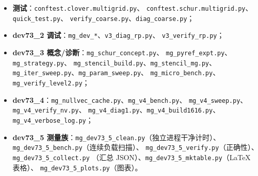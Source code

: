 \documentclass[11pt,a4paper]{article}
\begin{document}
\begin{itemize}
  \item \textbf{测试}：\texttt{conftest.clover.multigrid.py}、
        \texttt{conftest.schur.multigrid.py}、\texttt{quick\_test.py}、
        \texttt{verify\_coarse.py}、\texttt{diag\_coarse.py}；
  \item \textbf{dev73\_2 调试}：\texttt{mg\_dev\_*}、\texttt{v3\_diag\_rp.py}、
        \texttt{v3\_verify\_rp.py}；
  \item \textbf{dev73\_3 概念/诊断}：\texttt{mg\_schur\_concept.py}、
        \texttt{mg\_pyref\_expt.py}、\texttt{mg\_strategy.py}、
        \texttt{mg\_stencil\_build.py}、\texttt{mg\_stencil\_mg.py}、
        \texttt{mg\_iter\_sweep.py}、\texttt{mg\_param\_sweep.py}、
        \texttt{mg\_micro\_bench.py}、\texttt{mg\_verify\_level2.py}；
  \item \textbf{dev73\_4}：\texttt{mg\_nullvec\_cache.py}、\texttt{mg\_v4\_bench.py}、
        \texttt{mg\_v4\_sweep.py}、\texttt{mg\_v4\_verify\_nv.py}、
        \texttt{mg\_v4\_diag1.py}、\texttt{mg\_v4\_build1616.py}、
        \texttt{mg\_v4\_verbose\_log.py}；
  \item \textbf{dev73\_5 测量族}：\texttt{mg\_dev73\_5\_clean.py}（独立进程干净计时）、
        \texttt{mg\_dev73\_5\_bench.py}（连续负载扫描）、
        \texttt{mg\_dev73\_5\_verify.py}（正确性）、\texttt{mg\_dev73\_5\_collect.py}
        （汇总 JSON）、\texttt{mg\_dev73\_5\_mktable.py}（LaTeX 表格）、
        \texttt{mg\_dev73\_5\_plots.py}（图表）。
\end{itemize}
\end{document}
